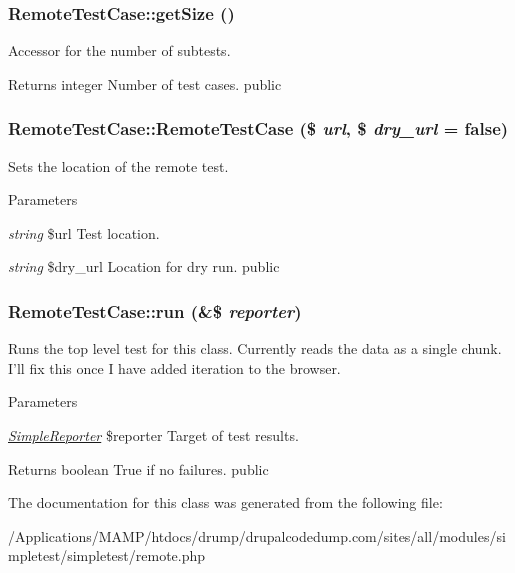 \hypertarget{class_remote_test_case_a22dd4b81206d8e163a23f14b828c5826}{
\subsubsection[{getSize}]{\setlength{\rightskip}{0pt plus 5cm}RemoteTestCase::getSize ()}}
\label{class_remote_test_case_a22dd4b81206d8e163a23f14b828c5826}
Accessor for the number of subtests. \begin{DoxyReturn}{Returns}
integer Number of test cases.  public 
\end{DoxyReturn}
\hypertarget{class_remote_test_case_af83e6243125f949fadac82abe7714769}{
\subsubsection[{RemoteTestCase}]{\setlength{\rightskip}{0pt plus 5cm}RemoteTestCase::RemoteTestCase (\$ {\em url}, \/  \$ {\em dry\_\-url} = {\ttfamily false})}}
\label{class_remote_test_case_af83e6243125f949fadac82abe7714769}
Sets the location of the remote test. 
\begin{DoxyParams}{Parameters}
\item[{\em string}]\$url Test location. \item[{\em string}]\$dry\_\-url Location for dry run.  public \end{DoxyParams}
\hypertarget{class_remote_test_case_ad6d2c5e3b7a342afc77f3a103cc25582}{
\subsubsection[{run}]{\setlength{\rightskip}{0pt plus 5cm}RemoteTestCase::run (\&\$ {\em reporter})}}
\label{class_remote_test_case_ad6d2c5e3b7a342afc77f3a103cc25582}
Runs the top level test for this class. Currently reads the data as a single chunk. I'll fix this once I have added iteration to the browser. 
\begin{DoxyParams}{Parameters}
\item[{\em \hyperlink{class_simple_reporter}{SimpleReporter}}]\$reporter Target of test results. \end{DoxyParams}
\begin{DoxyReturn}{Returns}
boolean True if no failures.  public 
\end{DoxyReturn}


The documentation for this class was generated from the following file:\begin{DoxyCompactItemize}
\item 
/Applications/MAMP/htdocs/drump/drupalcodedump.com/sites/all/modules/simpletest/simpletest/remote.php\end{DoxyCompactItemize}
